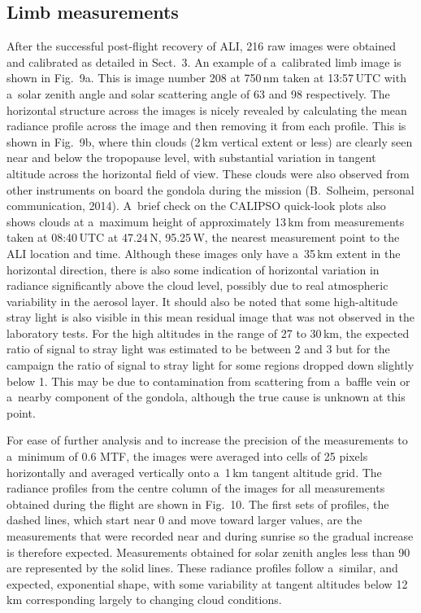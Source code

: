 \documentclass[amt]{copernicus}
\begin{document}
\subsection{Limb measurements}

After the successful post-flight recovery of ALI, 216 raw images were
obtained and calibrated as detailed in Sect.~3. An example of a~calibrated
limb image is shown in Fig.~9a. This is image number 208 at 750\,\unit{nm}
taken at 13:57\,UTC with a~solar zenith angle and solar scattering angle of
63 and 98{\degree} respectively. The horizontal structure across the images
is nicely revealed by calculating the mean radiance profile across the image
and then removing it from each profile. This is shown in Fig.~9b, where thin
clouds (2\,\unit{km} vertical extent or less) are clearly seen near and below
the tropopause level, with substantial variation in tangent altitude across
the horizontal field of view. These clouds were also observed from other
instruments on board the gondola during the mission (B.~Solheim, personal
communication, 2014). A~brief check on the CALIPSO quick-look plots also
shows clouds at a~maximum height of approximately 13\,\unit{km} from
measurements taken at 08:40\,UTC at 47.24{\degree}\,N, 95.25{\degree}\,W, the
nearest measurement point to the ALI location and time. Although these images
only have a~35\,\unit{km} extent in the horizontal direction, there is also
some indication of horizontal variation in radiance significantly above the
cloud level, possibly due to real atmospheric variability in the aerosol
layer. It should also be noted that some high-altitude stray light is also
visible in this mean residual image that was not observed in the laboratory
tests. For the high altitudes in the range of 27 to 30\,km, the expected ratio of signal
to stray light was estimated to be between 2 and 3 but for the campaign the ratio of signal
to stray light for some regions dropped down slightly below 1. This may be due to
contamination from scattering from a~baffle vein or
a~nearby component of the gondola, although the true cause is unknown at this
point.

For ease of further analysis and to increase the precision of the
measurements to a~minimum of 0.6 MTF, the images were averaged into
cells of 25 pixels horizontally and averaged vertically onto
a~1\,\unit{km} tangent altitude grid. The radiance profiles from the
centre column of the images for all measurements obtained during the
flight are shown in Fig.~10. The first sets of profiles, the dashed
lines, which start near 0 and move toward larger values, are the
measurements that were recorded near and during sunrise so the gradual
increase is therefore expected. Measurements obtained for solar zenith
angles less than 90{\degree} are represented by the solid lines. These
radiance profiles follow a~similar, and expected, exponential shape,
with some variability at tangent altitudes below 12\,\unit{km}
corresponding largely to changing cloud conditions.
\end{document}
